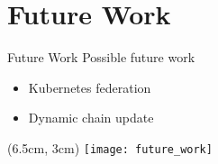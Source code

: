 \section{Future Work}
\begin{frame}{Future Work}
  Possible future work
  \begin{itemize}
  \item<1-> Kubernetes federation
  \item<2-> Dynamic chain update
  \end{itemize}

  \begin{textblock*}{5cm}(6.5cm, 3cm)
    \texttt{[image: future\_work]}
  \end{textblock*}
\end{frame}
